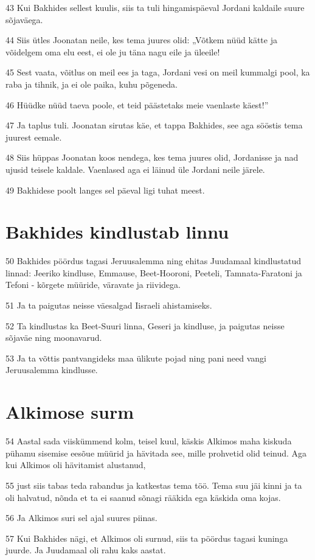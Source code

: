 \par 43 Kui Bakhides sellest kuulis, siis ta tuli hingamispäeval Jordani kaldaile suure sõjaväega.
\par 44 Siis ütles Joonatan neile, kes tema juures olid: „Võtkem nüüd kätte ja võidelgem oma elu eest, ei ole ju täna nagu eile ja üleeile!
\par 45 Sest vaata, võitlus on meil ees ja taga, Jordani vesi on meil kummalgi pool, ka raba ja tihnik, ja ei ole paika, kuhu põgeneda.
\par 46 Hüüdke nüüd taeva poole, et teid päästetaks meie vaenlaste käest!”
\par 47 Ja taplus tuli. Joonatan sirutas käe, et tappa Bakhides, see aga sööstis tema juurest eemale.
\par 48 Siis hüppas Joonatan koos nendega, kes tema juures olid, Jordanisse ja nad ujusid teisele kaldale. Vaenlased aga ei läinud üle Jordani neile järele.
\par 49 Bakhidese poolt langes sel päeval ligi tuhat meest. 

\section*{Bakhides kindlustab linnu}

\par 50 Bakhides pöördus tagasi Jeruusalemma ning ehitas Juudamaal kindlustatud linnad: Jeeriko kindluse, Emmause, Beet-Hooroni, Peeteli, Tamnata-Faratoni ja Tefoni - kõrgete müüride, väravate ja riividega.
\par 51 Ja ta paigutas neisse väesalgad Iisraeli ahistamiseks.
\par 52 Ta kindlustas ka Beet-Suuri linna, Geseri ja kindluse, ja paigutas neisse sõjaväe ning moonavarud.
\par 53 Ja ta võttis pantvangideks maa ülikute pojad ning pani need vangi Jeruusalemma kindlusse. 

\section*{Alkimose surm}

\par 54 Aastal sada viiskümmend kolm, teisel kuul, käskis Alkimos maha kiskuda pühamu sisemise eesõue müürid ja hävitada see, mille prohvetid olid teinud. Aga kui Alkimos oli hävitamist alustanud,
\par 55 just siis tabas teda rabandus ja katkestas tema töö. Tema suu jäi kinni ja ta oli halvatud, nõnda et ta ei saanud sõnagi rääkida ega käskida oma kojas.
\par 56 Ja Alkimos suri sel ajal suures piinas.
\par 57 Kui Bakhides nägi, et Alkimos oli surnud, siis ta pöördus tagasi kuninga juurde. Ja Juudamaal oli rahu kaks aastat. 

